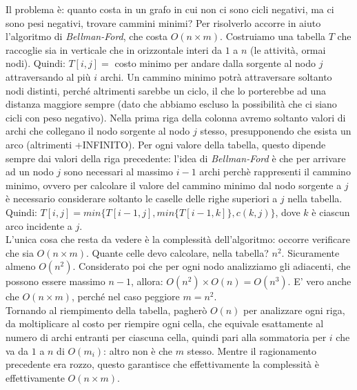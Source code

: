 Il problema è: quanto costa in un grafo in cui non ci sono cicli negativi, ma ci sono pesi negativi, trovare cammini minimi?
Per risolverlo accorre in aiuto l'algoritmo di \textit{Bellman-Ford}, che costa $O(n\times m)$.
Costruiamo una tabella $T$ che raccoglie sia in verticale che in orizzontale interi da $1$ a $n$ (le attività, ormai nodi). Quindi: $T[i,j] = $ costo minimo per andare dalla sorgente al nodo $j$ attraversando al più $i$ archi. Un cammino minimo potrà attraversare soltanto nodi distinti, perché altrimenti sarebbe un ciclo, il che lo porterebbe ad una distanza maggiore sempre (dato che abbiamo escluso la possibilità che ci siano cicli con peso negativo). Nella prima riga della colonna avremo soltanto valori di archi che collegano il nodo sorgente al nodo $j$ stesso, presupponendo che esista un arco (altrimenti +INFINITO). Per ogni valore della tabella, questo dipende sempre dai valori della riga precedente: l'idea di \textit{Bellman-Ford} è che per arrivare ad un nodo $j$ sono necessari al massimo $i-1$ archi perchè rappresenti il cammino minimo, ovvero per calcolare il valore del cammino minimo dal nodo sorgente a $j$ è necessario considerare soltanto le caselle delle righe superiori a $j$ nella tabella. Quindi: $T[i,j] = min\{T[i-1,j],min\{T[i-1,k]\},c(k,j)\}$, dove $k$ è ciascun arco incidente a $j$. \\
L'unica cosa che resta da vedere è la complessità dell'algoritmo: occorre verificare che sia $O(n\times m)$. Quante celle devo calcolare, nella tabella? $n^2$. Sicuramente almeno $O(n^2)$. Considerato poi che per ogni nodo analizziamo gli adiacenti, che possono essere massimo $n-1$, allora: $O(n^2)\times O(n) = O(n^3)$. E' vero anche che $O(n\times m)$, perché nel caso peggiore $m=n^2$. \\
Tornando al riempimento della tabella, pagherò $O(n)$ per analizzare ogni riga, da moltiplicare al costo per riempire ogni cella, che equivale esattamente al numero di archi entranti per ciascuna cella, quindi pari alla sommatoria per $i$ che va da $1$ a $n$ di $O(m_i)$: altro non è che $m$ stesso. Mentre il ragionamento precedente era rozzo, questo garantisce che effettivamente la complessità è effettivamente $O(n\times m)$.